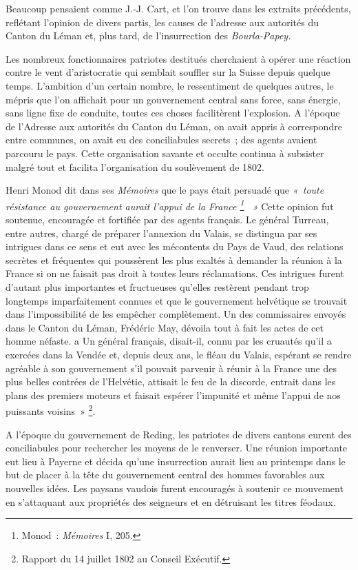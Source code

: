 \documentclass[french,twoside]{book} %
\begin{document}
\noindent Beaucoup pensaient comme J.-J. Cart, et l’on trouve dans les extraits précédents, reflétant l’opinion de divers partis, les causes de l’adresse aux autorités du Canton du Léman et, plus tard, de l’insurrection des \emph{Bourla-Papey.}\par
Les nombreux fonctionnaires patriotes destitués cherchaient à opérer une réaction contre le vent d’aristocratie qui semblait souffler sur la Suisse depuis quelque temps. L’ambition d’un certain nombre, le ressentiment de quelques autres, le mépris que l’on affichait pour un gouvernement central sans force, sans énergie, sans ligne fixe de conduite, toutes ces choses facilitèrent l’explosion. A l’époque de l’Adresse aux autorités du Canton du Léman, on avait appris à correspondre entre communes, on avait eu des conciliabules secrets ; des agents avaient parcouru le pays. Cette organisation savante et occulte continua à subsister malgré tout et facilita l’organisation du soulèvement de 1802.\par
Henri Monod dit dans ses \emph{Mémoires} que le pays était persuadé que \emph{« toute résistance au gouvernement aurait l’appui de la France \footnote{Monod : \emph{Mémoires} I, 205.}  »} Cette opinion fut soutenue, encouragée et fortifiée par des agents français. Le général Turreau, entre autres, chargé de préparer l’annexion du Valais, se distingua par ses intrigues dans ce sens et eut avec les mécontents du Pays de Vaud, des relations secrètes et fréquentes qui poussèrent les plus exaltés à demander la réunion à la France si on ne faisait pas droit à toutes leurs réclamations. Ces intrigues furent d’autant plus importantes et fructueuses qu’elles restèrent pendant trop longtemps imparfaitement connues et que le gouvernement helvétique se trouvait dans l’impossibilité de les empêcher complètement. Un des commissaires envoyés dans le Canton du Léman, Frédéric May, dévoila tout à fait les actes de cet homme néfaste. a Un général français, disait-il, connu par les cruautés qu’il a exercées dans la Vendée et, depuis deux ans, le fléau du Valais, espérant se rendre agréable à son gouvernement s’il pouvait parvenir à réunir à la France une des plus belles contrées de l’Helvétie, attisait le feu de la discorde, entrait dans les plans des premiers moteurs et faisait espérer l’impunité et même l’appui de nos puissants voisins » \footnote{Rapport du 14 juillet 1802 au Conseil Exécutif.}.\par
A l’époque du gouvernement de Reding, les patriotes de divers cantons eurent des conciliabules pour rechercher les moyens de le renverser. Une réunion importante eut lieu à Payerne et décida qu’une insurrection aurait lieu au printemps dans le but de placer à la tête du gouvernement central des hommes favorables aux nouvelles idées. Les paysans vaudois furent encouragés à soutenir ce mouvement en s’attaquant aux propriétés des seigneurs et en détruisant les titres féodaux.\par
\end{document}
